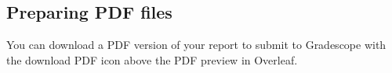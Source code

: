\documentclass{article}
\begin{document}
\subsection{Preparing PDF files}

You can download a PDF version of your report to submit to Gradescope with the download PDF icon above the PDF preview in Overleaf.







\end{document}
